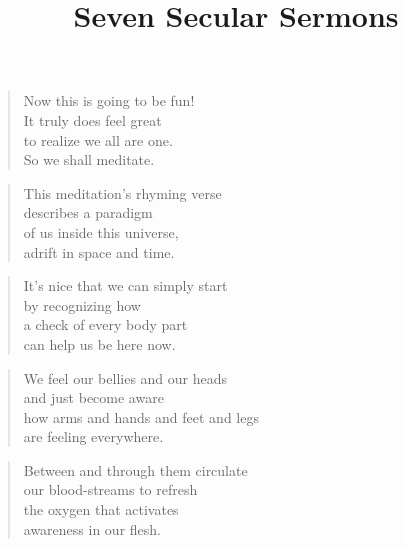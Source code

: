 \documentclass[10pt,a4paper]{article}
\begin{document}
\begin{titlepage}
\title{Seven Secular Sermons}
\date{}
\maketitle
%    
\end{titlepage}

\tableofcontents
\pagebreak

\begin{paracol}{2}


\begin{verse}
Now this is going to be fun!\\
It truly does feel great\\
to realize we all are one.\\
So we shall meditate.
\end{verse}

\begin{verse}
This meditation’s rhyming verse\\
describes a paradigm\\
of us inside this universe,\\
adrift in space and time.
\end{verse}

\begin{verse}
It’s nice that we can simply start\\
by recognizing how\\
a check of every body part\\
can help us be here now.
\end{verse}

\begin{verse}
We feel our bellies and our heads\\
and just become aware\\
how arms and hands and feet and legs\\
are feeling everywhere.
\end{verse}

\begin{verse}
Between and through them circulate\\
our blood-streams to refresh\\
the oxygen that activates\\
awareness in our flesh.
\end{verse}


\end{paracol}
\end{document}
